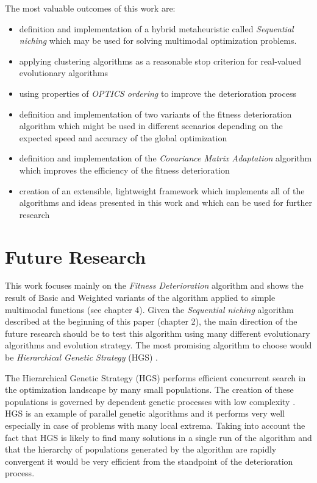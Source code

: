 The most valuable outcomes of this work are:
\begin{itemize}
  \item definition and implementation of a hybrid metaheuristic called \textit{Sequential
  niching} which may be used for solving multimodal optimization problems.
  \item applying clustering algorithms as a reasonable stop criterion for
  real-valued evolutionary algorithms
  \item using properties of \textit{OPTICS ordering} \cite{optics} to improve
  the deterioration process
  \item definition and implementation of two variants of the fitness
  deterioration algorithm which might be used in different scenarios depending
  on the expected speed and accuracy of the global optimization
  \item definition and implementation of the \textit{Covariance Matrix
  Adaptation} algorithm which improves the efficiency of the fitness
  deterioration
  \item creation of an extensible, lightweight framework which implements all of
  the algorithms and ideas presented in this work and which can be used for
  further research
\end{itemize}


\section{Future Research}

This work focuses mainly on the \textit{Fitness Deterioration} algorithm and
shows the result of Basic and Weighted variants of the algorithm applied to
simple multimodal functions (see chapter 4). Given the \textit{Sequential
niching} algorithm described at the beginning of this paper (chapter 2), the main
direction of the future research should be to test this algorithm using many 
different evolutionary algorithms and evolution strategy.
The most promising algorithm to choose would be \textit{Hierarchical Genetic
Strategy} (HGS) \cite{hgs}.

The Hierarchical Genetic Strategy (HGS) performs efficient concurrent
search in the optimization landscape by many small populations. The creation of
these populations is governed by dependent genetic processes with low complexity
\cite{hgs}. HGS is an example of parallel genetic algorithms and it performs
very well especially in case of problems with many local extrema.
Taking into account the fact that HGS is likely to find many solutions in a
single run of the algorithm and that the hierarchy of populations generated
by the algorithm are rapidly convergent it would be very efficient 
from the standpoint of the deterioration process.

